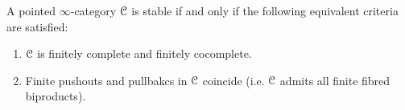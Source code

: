             \begin{proposition} \label{prop: stability_criteria_for_pointed_infinity_categories} 
                A pointed $\infty$-category $\mathcal{C}$ is stable if and only if the following equivalent criteria are satisfied:
                    \begin{enumerate}
                        \item $\mathcal{C}$ is finitely complete and finitely cocomplete.
                        \item Finite pushouts and pullbakcs in $\mathcal{C}$ coincide (i.e. $\mathcal{C}$ admits all finite fibred biproducts).
                    \end{enumerate}
            \end{proposition}
